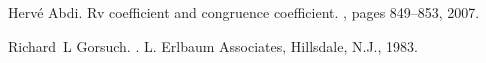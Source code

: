 \documentclass[12pt,letterpaper]{article}
\begin{document}
\clearpage



\begin{thebibliography}{}

Herv{\'e} Abdi.
\newblock Rv coefficient and congruence coefficient.
, pages 849--853,
  2007.

%
%
%
Richard~L Gorsuch.
.
\newblock L. Erlbaum Associates, Hillsdale, {N.J.}, 1983.
%
%
%
%

\end{thebibliography}
\end{document}
